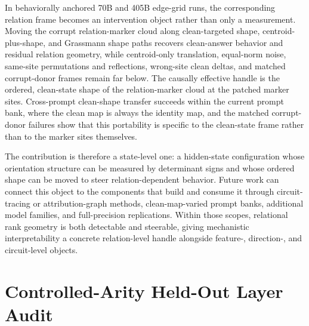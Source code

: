 \documentclass[11pt]{article}
\begin{document}
In behaviorally anchored 70B and 405B edge-grid runs, the corresponding relation frame becomes an intervention object rather than only a measurement. Moving the corrupt relation-marker cloud along clean-targeted shape, centroid-plus-shape, and Grassmann shape paths recovers clean-answer behavior and residual relation geometry, while centroid-only translation, equal-norm noise, same-site permutations and reflections, wrong-site clean deltas, and matched corrupt-donor frames remain far below. The causally effective handle is the ordered, clean-state shape of the relation-marker cloud at the patched marker sites. Cross-prompt clean-shape transfer succeeds within the current prompt bank, where the clean map is always the identity map, and the matched corrupt-donor failures show that this portability is specific to the clean-state frame rather than to the marker sites themselves.

The contribution is therefore a state-level one: a hidden-state configuration whose orientation structure can be measured by determinant signs and whose ordered shape can be moved to steer relation-dependent behavior. Future work can connect this object to the components that build and consume it through circuit-tracing or attribution-graph methods, clean-map-varied prompt banks, additional model families, and full-precision replications. Within those scopes, relational rank geometry is both detectable and steerable, giving mechanistic interpretability a concrete relation-level handle alongside feature-, direction-, and circuit-level objects.

\appendix

\section{Controlled-Arity Held-Out Layer Audit}
\end{document}
